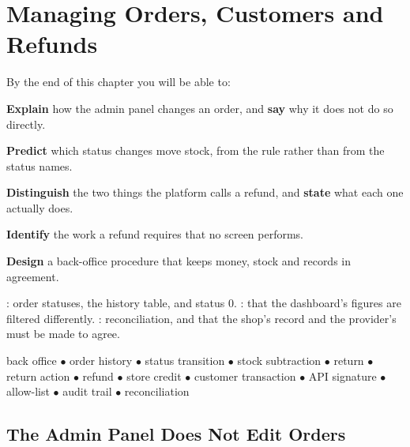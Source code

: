 \chapter{Managing Orders, Customers and Refunds}\label{ch:orders}

\begin{outcomes}
By the end of this chapter you will be able to:
\begin{tight}
  \item \textbf{Explain} how the admin panel changes an order, and \textbf{say}
        why it does not do so directly.
  \item \textbf{Predict} which status changes move stock, from the rule rather
        than from the status names.
  \item \textbf{Distinguish} the two things the platform calls a refund, and
        \textbf{state} what each one actually does.
  \item \textbf{Identify} the work a refund requires that no screen performs.
  \item \textbf{Design} a back-office procedure that keeps money, stock and
        records in agreement.
\end{tight}
\end{outcomes}

\begin{prereq}
: order statuses, the history table, and status 0.
: that the dashboard's figures are filtered differently.
: reconciliation, and that the shop's record and the provider's
must be made to agree.
\end{prereq}

\begin{keyterms}
back office $\bullet$ order history $\bullet$ status transition $\bullet$ stock
subtraction $\bullet$ return $\bullet$ return action $\bullet$ refund $\bullet$
store credit $\bullet$ customer transaction $\bullet$ API signature $\bullet$
allow-list $\bullet$ audit trail $\bullet$ reconciliation
\end{keyterms}

\section{The Admin Panel Does Not Edit Orders}

